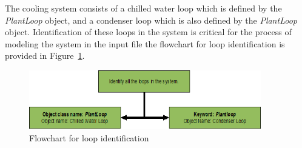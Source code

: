 The cooling system consists of a chilled water loop which is defined by the \emph{PlantLoop} object, and a condenser loop which is also defined by the \emph{PlantLoop} object. Identification of these loops in the system is critical for the process of modeling the system in the input file the flowchart for loop identification is provided in Figure~\ref{fig:flowchart-for-loop-identification}.

\begin{figure}[hbtp] %
\centering
\includegraphics[width=0.9\textwidth, height=0.9\textheight, keepaspectratio=true]{media/image014.png}
\caption{Flowchart for loop identification \protect \label{fig:flowchart-for-loop-identification}}
\end{figure}
